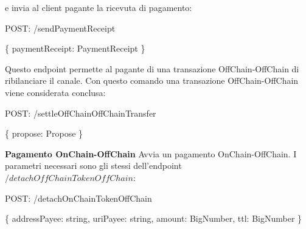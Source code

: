 \documentclass[12pt,italian,]{book}
\newenvironment{Shaded}{}{}
\newcommand{\DataTypeTok}[1]{\textcolor[rgb]{0.56,0.13,0.00}{#1}}
\newcommand{\NormalTok}[1]{#1}
\newcommand{\OperatorTok}[1]{\textcolor[rgb]{0.40,0.40,0.40}{#1}}
\newcommand{\SpecialStringTok}[1]{\textcolor[rgb]{0.73,0.40,0.53}{#1}}
\begin{document}
e invia al client pagante la ricevuta di pagamento:

\begin{Shaded}
\begin{Highlighting}[]
\NormalTok{POST}\OperatorTok{:} \SpecialStringTok{/sendPaymentReceipt}
\end{Highlighting}
\end{Shaded}

\begin{Shaded}
\begin{Highlighting}[]
\OperatorTok{\{}
    \DataTypeTok{paymentReceipt}\OperatorTok{:}\NormalTok{ PaymentReceipt}
\OperatorTok{\}}
\end{Highlighting}
\end{Shaded}

Questo endpoint permette al pagante di una transazione OffChain-OffChain di ribilanciare il canale. Con questo comando una transazione OffChain-OffChain viene considerata conclusa:

\begin{Shaded}
\begin{Highlighting}[]
\NormalTok{POST}\OperatorTok{:} \SpecialStringTok{/settleOffChainOffChainTransfer}
\end{Highlighting}
\end{Shaded}

\begin{Shaded}
\begin{Highlighting}[]
\OperatorTok{\{}
    \DataTypeTok{propose}\OperatorTok{:}\NormalTok{ Propose}
\OperatorTok{\}}
\end{Highlighting}
\end{Shaded}

\textbf{\textbf{Pagamento OnChain-OffChain}} Avvia un pagamento OnChain-OffChain. I parametri necessari sono gli stessi dell'endpoint \(/detachOffChainTokenOffChain\):

\begin{Shaded}
\begin{Highlighting}[]
\NormalTok{POST}\OperatorTok{:} \SpecialStringTok{/detachOnChainTokenOffChain}
\end{Highlighting}
\end{Shaded}

\begin{Shaded}
\begin{Highlighting}[]
\OperatorTok{\{}
    \DataTypeTok{addressPayee}\OperatorTok{:}\NormalTok{ string}\OperatorTok{,}
    \DataTypeTok{uriPayee}\OperatorTok{:}\NormalTok{ string}\OperatorTok{,}
    \DataTypeTok{amount}\OperatorTok{:}\NormalTok{ BigNumber}\OperatorTok{,}
    \DataTypeTok{ttl}\OperatorTok{:}\NormalTok{ BigNumber}
\OperatorTok{\}}
\end{Highlighting}
\end{Shaded}
\end{document}

